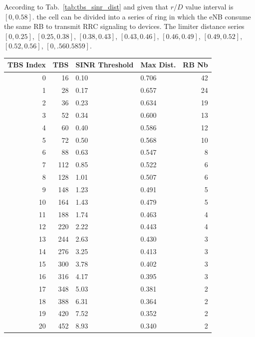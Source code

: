 According to Tab.~\ref{tab:tbs_sinr_dist} and given that $r/D$ value interval is $\left[ 0, 0.58\right] $. the cell can be divided into a series of ring in which the eNB consume the same RB to transmit RRC signaling to devices. The limiter distance series $\left[0,  0.25\right] $, $\left[0.25,  0.38\right] $, $\left[0.38,  0.43\right] $, $\left[0.43,  0.46\right] $, $\left[0.46,  0.49\right] $, $\left[0.49,  0.52\right] $, $\left[0.52,  0.56\right] $, $\left[0,.56  0.5859\right] $.
\begin{table}
	\centering
	\begin{tabular}{rrllr}
		\toprule
		TBS Index &  TBS & SINR Threshold & Max Dist. &  RB Nb \\
		\midrule
		0 &   16 &           0.10 &     0.706 &     42 \\
		1 &   28 &           0.17 &     0.657 &     24 \\
		2 &   36 &           0.23 &     0.634 &     19 \\
		3 &   52 &           0.34 &     0.600 &     13 \\
		4 &   60 &           0.40 &     0.586 &     12 \\
		5 &   72 &           0.50 &     0.568 &     10 \\
		6 &   88 &           0.63 &     0.547 &      8 \\
		7 &  112 &           0.85 &     0.522 &      6 \\
		8 &  128 &           1.01 &     0.507 &      6 \\
		9 &  148 &           1.23 &     0.491 &      5 \\
		10 &  164 &           1.43 &     0.479 &      5 \\
		11 &  188 &           1.74 &     0.463 &      4 \\
		12 &  220 &           2.22 &     0.443 &      4 \\
		13 &  244 &           2.63 &     0.430 &      3 \\
		14 &  276 &           3.25 &     0.413 &      3 \\
		15 &  300 &           3.78 &     0.402 &      3 \\
		16 &  316 &           4.17 &     0.395 &      3 \\
		17 &  348 &           5.03 &     0.381 &      2 \\
		18 &  388 &           6.31 &     0.364 &      2 \\
		19 &  420 &           7.52 &     0.352 &      2 \\
		20 &  452 &           8.93 &     0.340 &      2 \\

\end{tabular}
\end{table}
